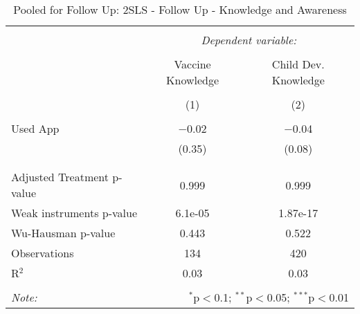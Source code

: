 
\begin{table}[!htbp] \centering 
  \caption{Pooled for Follow Up: 2SLS - Follow Up - Knowledge and Awareness} 
  \label{tbl:Pooled for Follow Up: 2SLS - Follow Up - Knowledge and Awareness} 
\begin{tabular}{@{\extracolsep{5pt}}lcc} 
\\[-1.8ex]\hline 
\hline \\[-1.8ex] 
 & \multicolumn{2}{c}{\textit{Dependent variable:}} \\ 
\cline{2-3} 
\\[-1.8ex] & Vaccine Knowledge & Child Dev. Knowledge \\ 
\\[-1.8ex] & (1) & (2)\\ 
\hline \\[-1.8ex] 
 Used App & $-$0.02 & $-$0.04 \\ 
  & (0.35) & (0.08) \\ 
  & & \\ 
\hline \\[-1.8ex] 
Adjusted Treatment p-value & 0.999 & 0.999 \\ 
Weak instruments p-value & 6.1e-05 & 1.87e-17 \\ 
Wu-Hausman p-value & 0.443 & 0.522 \\ 
Observations & 134 & 420 \\ 
R$^{2}$ & 0.03 & 0.03 \\ 
\hline 
\hline \\[-1.8ex] 
\textit{Note:}  & \multicolumn{2}{r}{$^{*}$p$<$0.1; $^{**}$p$<$0.05; $^{***}$p$<$0.01} \\ 
\end{tabular} 
\end{table} 
